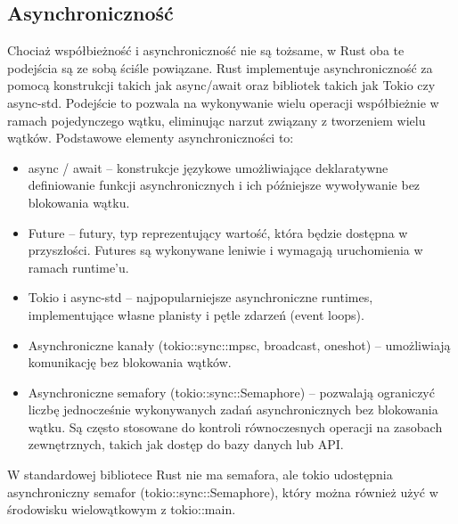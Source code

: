 \subsection{Asynchroniczność}
Chociaż współbieżność i asynchroniczność nie są tożsame, w Rust oba te podejścia są ze sobą ściśle powiązane. Rust implementuje asynchroniczność za pomocą konstrukcji takich jak async/await oraz bibliotek takich jak Tokio czy async-std. Podejście to pozwala na wykonywanie wielu operacji współbieżnie w ramach pojedynczego wątku, eliminując narzut związany z tworzeniem wielu wątków.
Podstawowe elementy asynchroniczności to:
\begin{itemize}
    \item async / await – konstrukcje językowe umożliwiające deklaratywne definiowanie funkcji asynchronicznych i ich późniejsze wywoływanie bez blokowania wątku.
    \item Future – futury, typ reprezentujący wartość, która będzie dostępna w przyszłości. Futures są wykonywane leniwie i wymagają uruchomienia w ramach runtime’u.
    \item Tokio i async-std – najpopularniejsze asynchroniczne runtimes, implementujące własne planisty i pętle zdarzeń (event loops).
    \item Asynchroniczne kanały (tokio::sync::mpsc, broadcast, oneshot) – umożliwiają komunikację bez blokowania wątków.
    \item Asynchroniczne semafory (tokio::sync::Semaphore) – pozwalają ograniczyć liczbę jednocześnie wykonywanych zadań asynchronicznych bez blokowania wątku. Są często stosowane do kontroli równoczesnych operacji na zasobach zewnętrznych, takich jak dostęp do bazy danych lub API.
\end{itemize}
W standardowej bibliotece Rust nie ma semafora, ale tokio udostępnia asynchroniczny semafor (tokio::sync::Semaphore), który można również użyć w środowisku wielowątkowym z tokio::main.

